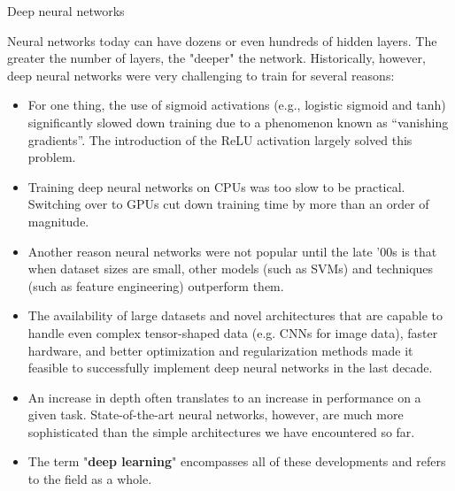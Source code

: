 \begin{vbframe}{Deep neural networks}

Neural networks today can have dozens or even hundreds of hidden layers. The greater the number of layers, the "deeper" the network. Historically, however, deep neural networks were very challenging to train for several reasons:
\lz
\begin{itemize}
\item For one thing, the use of sigmoid activations (e.g., logistic sigmoid and tanh) significantly slowed down training due to a phenomenon known as \enquote{vanishing gradients}. The introduction of the ReLU activation largely solved this problem.
\item Training deep neural networks on CPUs was too slow to be practical. Switching over to GPUs cut down training time by more than an order of magnitude.
\item Another reason neural networks were not popular until the late '00s is that when dataset sizes are small, other models (such as SVMs) and techniques (such as feature engineering) outperform them. 
\end{itemize}
\framebreak
\begin{itemize}
\item The availability of large datasets and novel architectures that are capable to handle even complex tensor-shaped data (e.g. CNNs for image data), faster hardware, and better optimization and regularization methods made it feasible to successfully implement deep neural networks in the last decade.
\lz

\item An increase in depth often translates to an increase in performance on a given task. State-of-the-art neural networks, however, are much more sophisticated than the simple architectures we have encountered so far.

\lz
\item The term "\textbf{deep learning}" encompasses all of these developments and refers to the field as a whole.
\end{itemize}
\end{vbframe}

\endlecture
